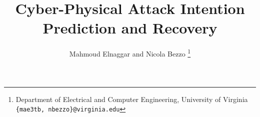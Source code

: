 \documentclass[letterpaper, 10 pt, conference]{ieeeconf}  %
\newcommand*{\affmark}[1][*]{\textsuperscript{#1}}
\begin{document}
\title{Cyber-Physical Attack Intention Prediction and Recovery}




\author{Mahmoud Elnaggar and Nicola Bezzo %
\thanks{Department of Electrical and Computer Engineering, University of Virginia
        {\tt\small  \{mae3tb, nbezzo\}@virginia.edu}}
}


\maketitle
\end{document}
